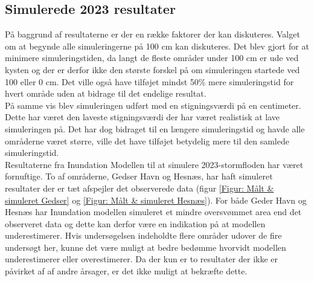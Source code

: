 


\label{Resultat Diskussion}
\subsection{Simulerede 2023 resultater}
På baggrund af resultaterne er der en række faktorer der kan diskuteres. Valget om at begynde alle simuleringerne på 100 cm kan diskuteres. Det blev gjort for at minimere simuleringstiden, da langt de fleste områder under 100 cm er ude ved kysten og der er derfor ikke den største forskel på om simuleringen startede ved 100 eller 0 cm. Det ville også have tilføjet mindst 50\% mere simuleringstid for hvert område uden at bidrage til det endelige resultat. \\ 
På samme vis blev simuleringen udført med en stigningsværdi på en centimeter. Dette har været den laveste stigningsværdi der har været realistisk at lave simuleringen på. Det har dog bidraget til en længere simuleringstid og havde alle områderne været større, ville det have tilføjet betydelig mere til den samlede simuleringstid. \\ 

Resultaterne fra Inundation Modellen til at simulere 2023-stormfloden har været fornuftige. To af områderne, Gedser Havn og Hesnæs, har haft simuleret resultater der er tæt afspejler det observerede data (figur \ref{Figur: Målt & simuleret Gedser} og \ref{Figur: Målt & simuleret Hesnæs}). For både Geder Havn og Hesnæs har Inundation modellen simuleret et mindre oversvømmet area end det observeret data og dette kan derfor være en indikation på at modellen underestimerer. Hvis undersøgelsen indeholdte flere områder udover de fire undersøgt her, kunne det være muligt at bedre bedømme hvorvidt modellen underestimerer eller overestimerer. Da der kun er to resultater der ikke er påvirket af af andre årsager, er det ikke muligt at bekræfte dette.\\

